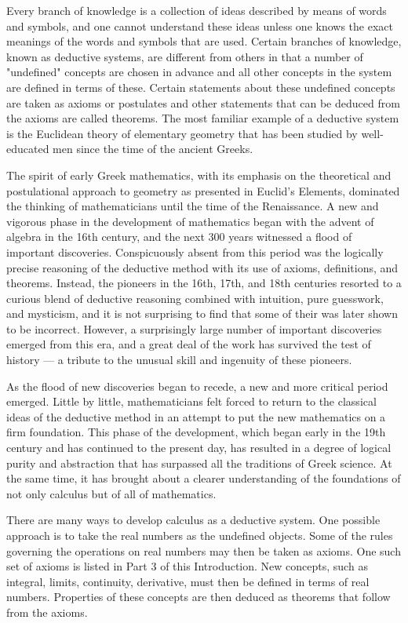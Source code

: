 \documentclass[cn,11pt,chinese]{elegantbook}
\numberwithin{equation}{section}
\begin{document}
Every branch of knowledge is a collection of ideas described by means of words and symbols, and one cannot understand these ideas unless one knows the exact meanings of the words and symbols that are used. Certain branches of knowledge, known as deductive systems, are different from others in that a number of "undefined" concepts are chosen in advance and all other concepts in the system are defined in terms of these. Certain statements about these undefined concepts are taken as axioms or postulates and other statements that can be deduced from the axioms are called theorems. The most familiar example of a deductive system is the Euclidean theory of elementary geometry that has been studied by well-educated men since the time of the ancient Greeks.

The spirit of early Greek mathematics, with its emphasis on the theoretical and postulational approach to geometry as presented in Euclid's Elements, dominated the thinking of mathematicians until the time of the Renaissance. A new and vigorous phase in the development of mathematics began with the advent of algebra in the 16th century, and the next 300 years witnessed a flood of important discoveries. Conspicuously absent from this period was the logically precise reasoning of the deductive method with its use of axioms, definitions, and theorems. Instead, the pioneers in the 16th, 17th, and 18th centuries resorted to a curious blend of deductive reasoning combined with intuition, pure guesswork, and mysticism, and it is not surprising to find that some of their was later shown to be incorrect. However, a surprisingly large number of important discoveries emerged from this era, and a great deal of the work has survived the test of history --- a tribute to the unusual skill and ingenuity of these pioneers.

As the flood of new discoveries began to recede, a new and more critical period emerged. Little by little, mathematicians felt forced to return to the classical ideas of the deductive method in an attempt to put the new mathematics on a firm foundation. This phase of the development, which began early in the 19th century and has continued to the present day, has resulted in a degree of logical purity and abstraction that has surpassed all the traditions of Greek science. At the same time, it has brought about a clearer understanding of the foundations of not only calculus but of all of mathematics.

There are many ways to develop calculus as a deductive system. One possible approach is to take the real numbers as the undefined objects. Some of the rules governing the operations on real numbers may then be taken as axioms. One such set of axioms is listed in Part 3 of this Introduction. New concepts, such as integral, limits, continuity, derivative, must then be defined in terms of real numbers. Properties of these concepts are then deduced as theorems that follow from the axioms.
\end{document}
